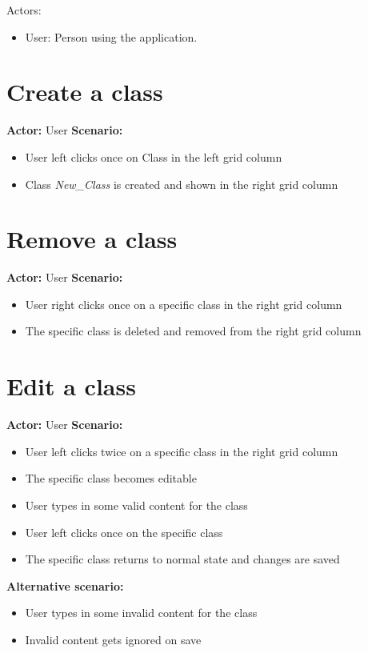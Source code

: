 Actors:
\begin{itemize}
\item User: Person using the application.
\end{itemize}

\section{Create a class}
\textbf{Actor:} User
\textbf{Scenario:}
\begin{itemize}
\item User left clicks once on Class in the left grid column
\item Class \textit{New\_Class} is created and shown in the right grid column
\end{itemize}

\section{Remove a class}
\textbf{Actor:} User
\textbf{Scenario:}
\begin{itemize}
\item User right clicks once on a specific class in the right grid column
\item The specific class is deleted and removed from the right grid column
\end{itemize}

\section{Edit a class}
\textbf{Actor:} User
\textbf{Scenario:}
\begin{itemize}
\item User left clicks twice on a specific class in the right grid column
\item The specific class becomes editable
\item User types in some valid content for the class
\item User left clicks once on the specific class
\item The specific class returns to normal state and changes are saved
\end{itemize}
\textbf{Alternative scenario:} 
\begin{itemize}
\item User types in some invalid content for the class
\item Invalid content gets ignored on save
\end{itemize}

